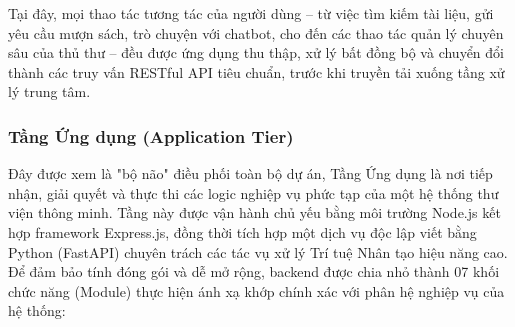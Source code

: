 Tại đây, mọi thao tác tương tác của người dùng – từ việc tìm kiếm tài liệu, gửi yêu cầu mượn sách, trò chuyện với chatbot, cho đến các thao tác quản lý chuyên sâu của thủ thư – đều được ứng dụng thu thập, xử lý bất đồng bộ và chuyển đổi thành các truy vấn RESTful API tiêu chuẩn, trước khi truyền tải xuống tầng xử lý trung tâm.

\subsubsection{Tầng Ứng dụng (Application Tier)}
Đây được xem là "bộ não" điều phối toàn bộ dự án, Tầng Ứng dụng là nơi tiếp nhận, giải quyết và thực thi các logic nghiệp vụ phức tạp của một hệ thống thư viện thông minh. Tầng này được vận hành chủ yếu bằng môi trường Node.js kết hợp framework Express.js, đồng thời tích hợp một dịch vụ độc lập viết bằng Python (FastAPI) chuyên trách các tác vụ xử lý Trí tuệ Nhân tạo hiệu năng cao. Để đảm bảo tính đóng gói và dễ mở rộng, backend được chia nhỏ thành 07 khối chức năng (Module) thực hiện ánh xạ khớp chính xác với phân hệ nghiệp vụ của hệ thống:

